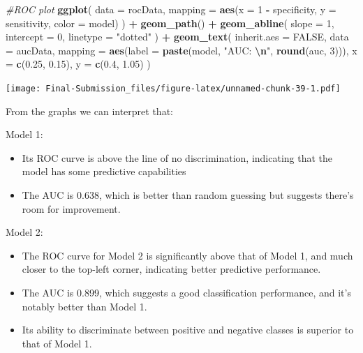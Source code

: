\documentclass[
]{article}
\newenvironment{Shaded}{\begin{snugshade}}{\end{snugshade}}
\newcommand{\AttributeTok}[1]{\textcolor[rgb]{0.13,0.29,0.53}{#1}}
\newcommand{\CommentTok}[1]{\textcolor[rgb]{0.56,0.35,0.01}{\textit{#1}}}
\newcommand{\ConstantTok}[1]{\textcolor[rgb]{0.56,0.35,0.01}{#1}}
\newcommand{\DecValTok}[1]{\textcolor[rgb]{0.00,0.00,0.81}{#1}}
\newcommand{\FloatTok}[1]{\textcolor[rgb]{0.00,0.00,0.81}{#1}}
\newcommand{\FunctionTok}[1]{\textcolor[rgb]{0.13,0.29,0.53}{\textbf{#1}}}
\newcommand{\NormalTok}[1]{#1}
\newcommand{\SpecialCharTok}[1]{\textcolor[rgb]{0.81,0.36,0.00}{\textbf{#1}}}
\newcommand{\StringTok}[1]{\textcolor[rgb]{0.31,0.60,0.02}{#1}}
\begin{document}
\begin{Shaded}
\begin{Highlighting}[]
\CommentTok{\#ROC plot}
\FunctionTok{ggplot}\NormalTok{(}
  \AttributeTok{data =}\NormalTok{ rocData,}
  \AttributeTok{mapping =} \FunctionTok{aes}\NormalTok{(}\AttributeTok{x =} \DecValTok{1} \SpecialCharTok{{-}}\NormalTok{ specificity, }\AttributeTok{y =}\NormalTok{ sensitivity, }\AttributeTok{color =}\NormalTok{ model)}
\NormalTok{) }\SpecialCharTok{+}
  \FunctionTok{geom\_path}\NormalTok{() }\SpecialCharTok{+}
  \FunctionTok{geom\_abline}\NormalTok{(}
    \AttributeTok{slope =} \DecValTok{1}\NormalTok{,}
    \AttributeTok{intercept =} \DecValTok{0}\NormalTok{,}
    \AttributeTok{linetype =} \StringTok{"dotted"}
\NormalTok{  ) }\SpecialCharTok{+}
  \FunctionTok{geom\_text}\NormalTok{(}
  \AttributeTok{inherit.aes =} \ConstantTok{FALSE}\NormalTok{,}
  \AttributeTok{data =}\NormalTok{ aucData,}
  \AttributeTok{mapping =} \FunctionTok{aes}\NormalTok{(}\AttributeTok{label =} \FunctionTok{paste}\NormalTok{(model, }\StringTok{"AUC: }\SpecialCharTok{\textbackslash{}n}\StringTok{"}\NormalTok{, }\FunctionTok{round}\NormalTok{(auc, }\DecValTok{3}\NormalTok{))),}
  \AttributeTok{x =} \FunctionTok{c}\NormalTok{(}\FloatTok{0.25}\NormalTok{, }\FloatTok{0.15}\NormalTok{),}
  \AttributeTok{y =} \FunctionTok{c}\NormalTok{(}\FloatTok{0.4}\NormalTok{, }\FloatTok{1.05}\NormalTok{)}
\NormalTok{)}
\end{Highlighting}
\end{Shaded}

\texttt{[image: Final-Submission\_files/figure-latex/unnamed-chunk-39-1.pdf]}

From the graphs we can interpret that:

Model 1:

\begin{itemize}
\item
  Its ROC curve is above the line of no discrimination, indicating that
  the model has some predictive capabilities
\item
  The AUC is 0.638, which is better than random guessing but suggests
  there's room for improvement.
\end{itemize}

Model 2:

\begin{itemize}
\item
  The ROC curve for Model 2 is significantly above that of Model 1, and
  much closer to the top-left corner, indicating better predictive
  performance.
\item
  The AUC is 0.899, which suggests a good classification performance,
  and it's notably better than Model 1.
\item
  Its ability to discriminate between positive and negative classes is
  superior to that of Model 1.
\end{itemize}
\end{document}
